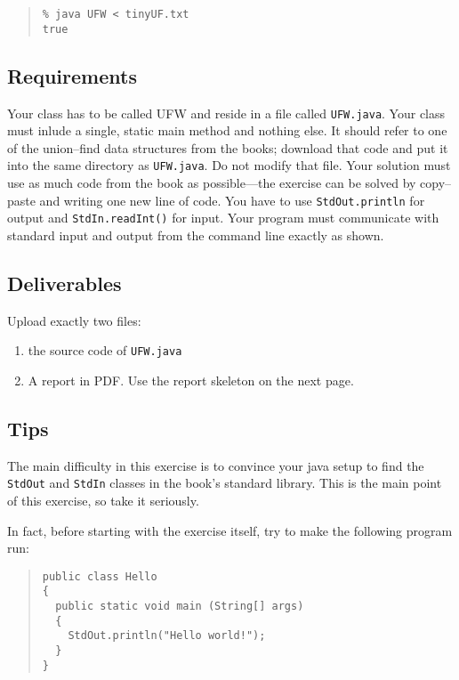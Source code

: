 \documentclass{tufte-handout}
\begin{document}
\begin{quotation}
\begin{verbatim}
% java UFW < tinyUF.txt
true
\end{verbatim}
\end{quotation}

\subsection{Requirements}

Your class has to be called UFW and reside in a file called {\tt UFW.java}.
Your class must inlude a single, static main method and nothing else.
It should refer to one of the union--find data structures from the books; download that code and put it into the same directory as {\tt UFW.java}.
Do not modify that file.
Your solution must use as much code from the book as possible---the exercise can be solved by copy--paste and writing one new line of code.
You have to use {\tt StdOut.println} for output and {\tt StdIn.readInt()} for input.
Your program must communicate with standard input and output from the command line exactly as shown.

\subsection{Deliverables}

Upload exactly two files:

\begin{enumerate}
\item the source code of {\tt UFW.java}
\item A report in PDF. 
  Use the report skeleton on the next page.
\end{enumerate}

\subsection{Tips}
The main difficulty in this exercise is to convince your java setup to find the {\tt StdOut} and {\tt StdIn} classes in the book's standard library.
This is the main point of this exercise, so take it seriously. 

In fact, before starting with the exercise itself, try to make the following program run:

\begin{quotation}
\begin{verbatim}
public class Hello
{
  public static void main (String[] args)
  {
    StdOut.println("Hello world!");
  }
}
\end{verbatim}
\end{quotation}
\end{document}
